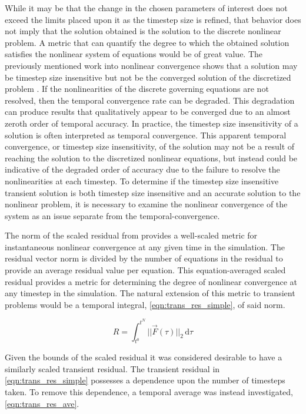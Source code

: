 While it may be that the change in the chosen parameters of interest does not exceed the limits placed upon it as the timestep size is refined, that behavior does not imply that the solution obtained is the solution to the discrete nonlinear problem.
A metric that can quantify the degree to which the obtained solution satisfies the nonlinear system of equations would be of great value.
The previously mentioned work into nonlinear convergence shows that a solution may be timestep size insensitive but not be the converged solution of the discretized problem \cite{Knoll2001}.
If the nonlinearities of the discrete governing equations are not resolved, then the temporal convergence rate can be degraded.
This degradation can produce results that qualitatively appear to be converged due to an almost zeroth order of temporal accuracy.
In practice, the timestep size insensitivity of a solution is often interpreted as temporal convergence.
This apparent temporal convergence, or timestep size insensitivity, of the solution may not be a result of reaching the solution to the discretized nonlinear equations, but instead could be indicative of the degraded order of accuracy due to the failure to resolve the nonlinearities at each timestep.
To determine if the timestep size insensitive transient solution is both timestep size insensitive and an accurate solution to the nonlinear problem, it is necessary to examine the nonlinear convergence of the system as an issue separate from the temporal-convergence.

The norm of the scaled residual from  provides a well-scaled metric for instantaneous nonlinear convergence at any given time in the simulation.
The residual vector norm is divided by the number of equations in the residual to provide an average residual value per equation.
This equation-averaged scaled residual provides a metric for determining the degree of nonlinear convergence at any timestep in the simulation.
The natural extension of this metric to transient problems would be a temporal integral, \eqref{eqn:trans_res_simple}, of said norm.

\begin{equation}
\label{eqn:trans_res_simple}
R = \int_{t^{0}}^{t^{N}} ||\vec{F}(\tau)||_2 \,\mathrm{d} \tau
\end{equation}

Given the bounds of the scaled residual it was considered desirable to have a similarly scaled transient residual.
The transient residual in \eqref{eqn:trans_res_simple} possesses a dependence upon the number of timesteps taken.
To remove this dependence, a temporal average was instead investigated, \eqref{eqn:trans_res_ave}.

